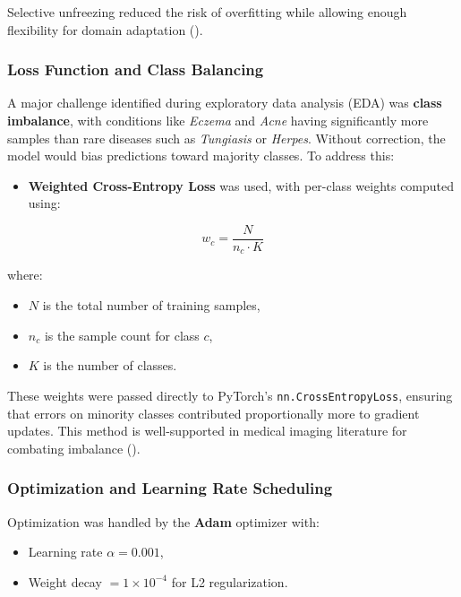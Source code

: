 \documentclass[
  12pt,
  oneside]{article}
\providecommand{\tightlist}{%
  \setlength{\itemsep}{0pt}\setlength{\parskip}{0pt}}
\begin{document}
Selective unfreezing reduced the risk of overfitting while allowing
enough flexibility for domain adaptation
().

\subsubsection{Loss Function and Class
Balancing}\label{loss-function-and-class-balancing-1}

A major challenge identified during exploratory data analysis (EDA) was
\textbf{class imbalance}, with conditions like \emph{Eczema} and
\emph{Acne} having significantly more samples than rare diseases such as
\emph{Tungiasis} or \emph{Herpes}. Without correction, the model would
bias predictions toward majority classes. To address this:

\begin{itemize}
\tightlist
\item
  \textbf{Weighted Cross-Entropy Loss} was used, with per-class weights
  computed using:
\end{itemize}

\[
w_c = \frac{N}{n_c \cdot K}
\]

where:

\begin{itemize}
\tightlist
\item
  \(N\) is the total number of training samples,
\item
  \(n_c\) is the sample count for class \(c\),
\item
  \(K\) is the number of classes.
\end{itemize}

These weights were passed directly to PyTorch's
\texttt{nn.CrossEntropyLoss}, ensuring that errors on minority classes
contributed proportionally more to gradient updates. This method is
well-supported in medical imaging literature for combating imbalance
().

\subsubsection{Optimization and Learning Rate
Scheduling}\label{optimization-and-learning-rate-scheduling}

Optimization was handled by the \textbf{Adam} optimizer with:

\begin{itemize}
\tightlist
\item
  Learning rate \(\alpha = 0.001\),
\item
  Weight decay \(= 1\times 10^{-4}\) for L2 regularization.
\end{itemize}
\end{document}
